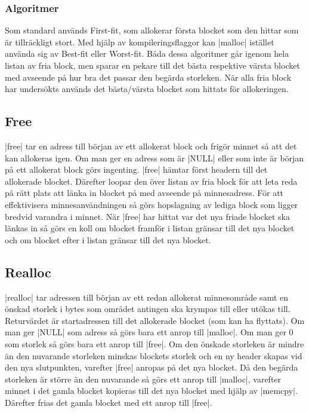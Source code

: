\documentclass[paper=a4, fontsize=11pt]{scrartcl} %
\numberwithin{equation}{section} %
\numberwithin{figure}{section} %
\numberwithin{table}{section} %
\begin{document}
\subsubsection{Algoritmer}
Som standard används First-fit, som allokerar första blocket som den hittar
som är tillräckligt stort.
Med hjälp av kompileringsflaggor kan |malloc| istället använda sig av Best-fit
eller Worst-fit.
Båda dessa algoritmer går igenom hela listan av fria block, men sparar en
pekare till det bästa respektive värsta blocket med avseende på hur bra det
passar den begärda storleken.
När alla fria block har undersökts används det bästa/värsta blocket som hittats
för allokeringen.

\subsection{Free}
|free| tar en adress till början av ett allokerat block och frigör minnet så
att det kan allokeras igen.
Om man ger en adress som är |NULL| eller som inte är början på ett allokerat
block görs ingenting.
|free| hämtar först headern till det allokerade blocket.
Därefter loopar den över listan av fria block för att leta reda på rätt plats
att länka in blocket på med avseende på minnesadress.
För att effektivisera minnesanvändningen så görs hopslagning av lediga block
som ligger bredvid varandra i minnet.
När |free| har hittat var det nya friade blocket ska länkas in så görs en koll
om blocket framför i listan gränsar till det nya blocket och om blocket
efter i listan gränsar till det nya blocket.

\subsection{Realloc}
|realloc| tar adressen till början av ett redan allokerat minnesområde samt
en önskad storlek i bytes som området antingen ska krympas till eller utökas
till.
Returvärdet är startadressen till det allokerade blocket (som kan ha flyttats).
Om man ger |NULL| som adress så görs bara ett anrop till |malloc|.
Om man ger 0 som storlek så görs bara ett anrop till |free|.
Om den önskade storleken är mindre än den nuvarande storleken minskas blockets
storlek och en ny header skapas vid den nya slutpunkten, varefter |free| anropas på
det nya blocket.
Då den begärda storleken är större än den nuvarande så görs ett anrop till
|malloc|, varefter minnet i det gamla blocket kopieras till det nya blocket
med hjälp av |memcpy|.
Därefter frias det gamla blocket med ett anrop till |free|.
\end{document}
